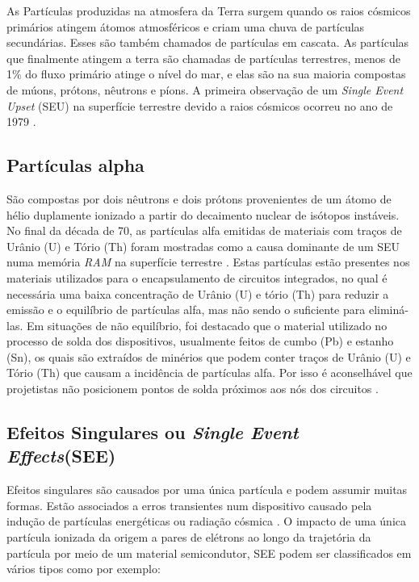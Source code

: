 As Partículas produzidas na atmosfera da Terra surgem quando os raios cósmicos primários atingem átomos atmosféricos e criam uma chuva de partículas secundárias. Esses são também chamados de partículas em cascata. As partículas que finalmente atingem a terra são chamadas de partículas terrestres, menos de 1\% do fluxo primário atinge o nível do mar, e elas são na sua maioria compostas de múons, prótons, nêutrons e píons. A primeira observação de um \textit{Single Event Upset} (SEU) na superfície terrestre devido a raios cósmicos ocorreu no ano de 1979 \cite{ZieglerLandFord:1979}.


\subsection{Partículas alpha}

São compostas por dois nêutrons e dois prótons provenientes de um átomo de hélio duplamente ionizado a partir do decaimento nuclear de isótopos instáveis. No final da década de 70, as partículas alfa emitidas de materiais com traços de Urânio (U) e Tório (Th) foram mostradas como a causa dominante de um SEU numa memória \textit{RAM} na superfície terrestre \cite{Woods:1978}. Estas partículas estão presentes nos materiais utilizados para o encapsulamento de circuitos integrados, no qual é necessária uma baixa concentração de Urânio (U) e tório (Th) para reduzir a emissão e o equilíbrio de partículas alfa, mas não sendo o suficiente para eliminá-las. Em situações de não equilíbrio, foi destacado que o material utilizado no processo de solda dos dispositivos, usualmente feitos de cumbo (Pb) e estanho (Sn), os quais são extraídos de minérios que podem conter traços de Urânio (U) e Tório (Th) que causam a incidência de partículas alfa. Por isso é aconselhável que projetistas não posicionem pontos de solda próximos aos nós dos circuitos \cite{Velazco:2007}.


\subsection{Efeitos Singulares ou \textit{Single Event Effects}(SEE)} \label{subsec:EfeitosSingulares}

Efeitos singulares são causados por uma única partícula e podem assumir muitas formas. Estão associados a erros transientes num dispositivo causado pela indução de partículas energéticas ou radiação cósmica \cite{Yu:2008}. O impacto de uma única partícula ionizada da origem a pares de elétrons ao longo da trajetória da partícula por meio de um material semicondutor, SEE podem ser classificados em vários tipos como por exemplo:

